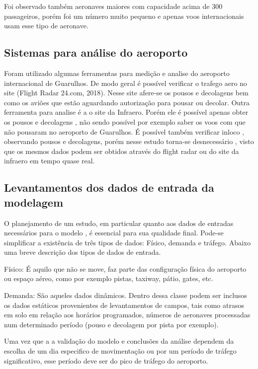 \documentclass[12pt]{article}
\begin{document}
  Foi observado também aeronaves maiores com capacidade acima de 300 passageiros, porém 
  foi um número muito pequeno e apenas voos internacionais usam esse tipo de aeronave.
  
  \subsection{Sistemas para análise do aeroporto}
  
  Foram utilizado algumas ferramentas para medição e analise do aeroporto 
  internacional de Guarulhos. De modo geral é possível verificar o trafego
  aero no site (Flight Radar 24.com, 2018). Nesse site afere-se os pousos 
  e decolagens bem como os aviões que estão aguardando autorização para pousar
  ou decolar. Outra ferramenta para analise é a o site da Infraero. Porém 
  ele é possível apenas obter os pousos e decolagens , não sendo possível
  por exemplo saber os voos com que não pousaram no aeroporto de Guarulhos.
  É possível também verificar inloco , observando pousos e decolagens, porém
  nesse estudo torna-se desnecessário , visto que os mesmos dados podem ser
  obtidos através do flight radar ou do site da infraero em tempo quase
  real.
  
  \subsection{Levantamentos dos dados de entrada da modelagem}
  
  O planejamento de um estudo, em particular quanto aos dados de entradas
  necessários para o modelo , é essencial para sua qualidade final. Pode-se
  simplificar a existência de três tipos de dados: Físico, demanda e tráfego. 
  Abaixo uma breve descrição dos tipos de dados de entrada.
  
  Físico: É aquilo que não se move, faz parte das configuração física do 
  aeroporto ou espaço aéreo, como por exemplo pistas, taxiway, pátio, gates, etc.
  
  Demanda: São aqueles dados dinâmicos. Dentro dessa classe podem ser inclusos os 
  dados estáticos provenientes de levantamentos de campos, tais como
  atrasos em solo em relação aos horários programados, números de aeronaves
  processadas num determinado período (pouso e decolagem por pista por 
  exemplo).
  
  Uma vez que a a validação do modelo e conclusões da análise dependem da
  escolha de um dia especifico de movimentação ou por um período de tráfego
  significativo, esse período deve ser do pico de tráfego do aeroporto.
  
\end{document}
